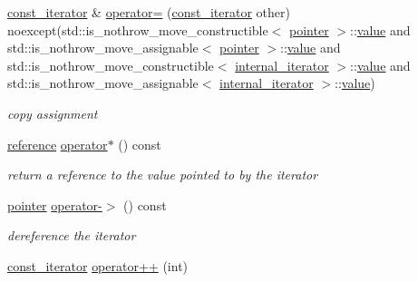 \begin{DoxyCompactItemize}
\hyperlink{classnlohmann_1_1basic__json_1_1const__iterator}{const\+\_\+iterator} \& \hyperlink{classnlohmann_1_1basic__json_1_1const__iterator_a2b6561a7b39b9aa3a220aa3b6e2d9589}{operator=} (\hyperlink{classnlohmann_1_1basic__json_1_1const__iterator}{const\+\_\+iterator} other) noexcept(std\+::is\+\_\+nothrow\+\_\+move\+\_\+constructible$<$ \hyperlink{classnlohmann_1_1basic__json_1_1const__iterator_a1da96fc3054d547e7706d3a2f073f389}{pointer} $>$\+::\hyperlink{classnlohmann_1_1basic__json_1_1const__iterator_a0f42e99f14ac0a46456cf96fb384f290}{value} and std\+::is\+\_\+nothrow\+\_\+move\+\_\+assignable$<$ \hyperlink{classnlohmann_1_1basic__json_1_1const__iterator_a1da96fc3054d547e7706d3a2f073f389}{pointer} $>$\+::\hyperlink{classnlohmann_1_1basic__json_1_1const__iterator_a0f42e99f14ac0a46456cf96fb384f290}{value} and std\+::is\+\_\+nothrow\+\_\+move\+\_\+constructible$<$ \hyperlink{structnlohmann_1_1basic__json_1_1internal__iterator}{internal\+\_\+iterator} $>$\+::\hyperlink{classnlohmann_1_1basic__json_1_1const__iterator_a0f42e99f14ac0a46456cf96fb384f290}{value} and std\+::is\+\_\+nothrow\+\_\+move\+\_\+assignable$<$ \hyperlink{structnlohmann_1_1basic__json_1_1internal__iterator}{internal\+\_\+iterator} $>$\+::\hyperlink{classnlohmann_1_1basic__json_1_1const__iterator_a0f42e99f14ac0a46456cf96fb384f290}{value})
\begin{DoxyCompactList}\small\item\em copy assignment \end{DoxyCompactList}\item 
\hyperlink{classnlohmann_1_1basic__json_1_1const__iterator_aefd248cac6493eed1e6ff53ba6a63eb2}{reference} \hyperlink{classnlohmann_1_1basic__json_1_1const__iterator_acfc918b6350449111ca58af5eb3da999}{operator$\ast$} () const
\begin{DoxyCompactList}\small\item\em return a reference to the value pointed to by the iterator \end{DoxyCompactList}\item 
\hyperlink{classnlohmann_1_1basic__json_1_1const__iterator_a1da96fc3054d547e7706d3a2f073f389}{pointer} \hyperlink{classnlohmann_1_1basic__json_1_1const__iterator_abae808b09a822cc3da4cef0efb89115d}{operator-\/$>$} () const
\begin{DoxyCompactList}\small\item\em dereference the iterator \end{DoxyCompactList}\item 
\hyperlink{classnlohmann_1_1basic__json_1_1const__iterator}{const\+\_\+iterator} \hyperlink{classnlohmann_1_1basic__json_1_1const__iterator_a8dbaec5bf8ccba3225520356629061cb}{operator++} (int)

\end{DoxyCompactItemize}

